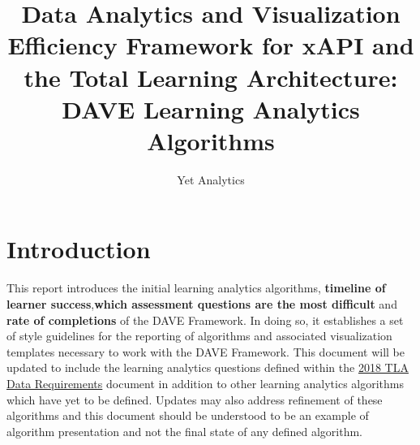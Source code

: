 \documentclass{article}
\title{Data Analytics and Visualization Efficiency Framework for xAPI and the Total Learning Architecture: DAVE Learning Analytics Algorithms}
\author{Yet Analytics}
\begin{document}
\begin{titlepage}
  \maketitle
\end{titlepage}

\section*{Introduction}
This report introduces the initial learning analytics algorithms,
\textbf{timeline of learner success},\textbf{which assessment
  questions are the most difficult} and \textbf{rate of completions}
of the DAVE Framework. In doing so, it establishes a set of style
guidelines for the reporting of algorithms and associated
visualization templates necessary to work with the DAVE
Framework. This document will be updated to include the learning
analytics questions defined within the
\href{https://adloffice365.sharepoint.com/sites/TLA_Extranet/Shared\%20Documents/2018\%20TLA\%20Data\%20Requirements\%20Aligned\%20to\%20Event.docx?d=w1cf1d6fe161b4606a11c130baae5f5e1}{2018
  TLA Data Requirements} document in addition to other learning
analytics algorithms which have yet to be defined. Updates may also
address refinement of these algorithms and this document should be
understood to be an example of algorithm presentation and not the
final state of any defined algorithm.
\end{document}
